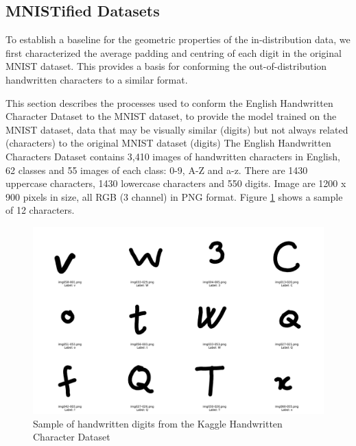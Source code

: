 
\subsection{MNISTified Datasets}

To establish a baseline for the geometric properties of the in-distribution data, we first characterized the average padding and centring of each digit in the original MNIST dataset. This provides a basis for conforming the out-of-distribution handwritten characters to a similar format.

This section describes the processes used to conform the English Handwritten Character Dataset \cite{deCampos09} to the MNIST dataset, to provide the model trained on the MNIST dataset, data that may be visually similar (digits) but not always related (characters) to the original MNIST dataset (digits)
The English Handwritten Characters Dataset  contains 3,410 images of handwritten characters in English, 62 classes and 55 images of each class: 0-9, A-Z and a-z. There are 1430 uppercase characters, 1430 lowercase characters and 550 digits. Image are 1200 x 900 pixels in size, all RGB (3 channel) in PNG format. Figure \ref{fig:sample_handwritten_characters} shows a sample of 12 characters. 

\begin{figure}[ht]
    \centering
    \includegraphics[width=0.99\columnwidth]{Figures/Results/HandwrittenCharacters/sample_handwritten_characters.png}
    \caption{Sample of handwritten digits from the Kaggle Handwritten Character Dataset}
\label{fig:sample_handwritten_characters}
\end{figure}

